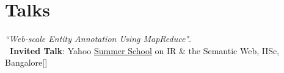 \vspace{-0.1cm}
\section{\mysidestyle Talks}
\vspace{0mm}
\textit{``Web-scale Entity Annotation Using MapReduce"}. \\
\textbf{\ Invited Talk}: Yahoo \href{https://www.eventbrite.com/e/yahoo-summer-school-2013-registration-6688943811#}{Summer School} on IR \& the Semantic Web, IISc, Bangalore\hfill{[]}

